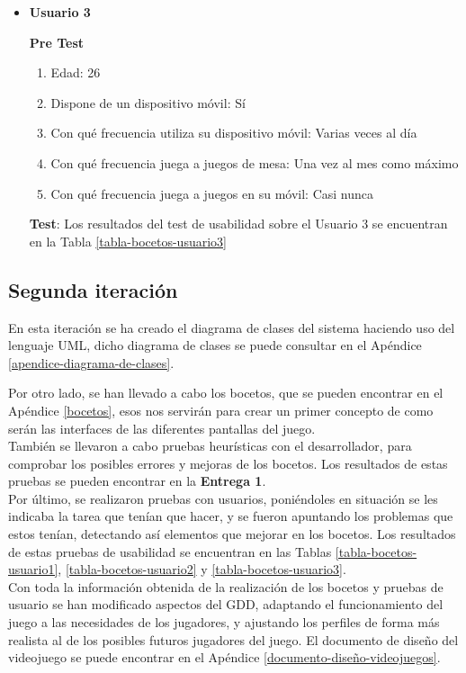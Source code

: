 \begin{itemize}
  \item \textbf{Usuario 3}

  \textbf{Pre Test}

  \begin{enumerate}
    \item Edad: 26
    \item Dispone de un dispositivo móvil: Sí
    \item Con qué frecuencia utiliza su dispositivo móvil: Varias veces al día
    \item Con qué frecuencia juega a juegos de mesa: Una vez al mes como máximo
    \item Con qué frecuencia juega a juegos en su móvil: Casi nunca
  \end{enumerate}

  \textbf{Test}: Los resultados del test de usabilidad sobre el Usuario 3 se encuentran en la Tabla \ref{tabla-bocetos-usuario3}

\end{itemize}

\subsection{Segunda iteración}
En esta iteración se ha creado el diagrama de clases del sistema haciendo uso del lenguaje UML, dicho diagrama de clases se puede consultar en el Apéndice \ref{apendice-diagrama-de-clases}.

Por otro lado, se han llevado a cabo los bocetos, que se pueden encontrar en el Apéndice \ref{bocetos}, esos nos servirán para crear un primer concepto de como serán las interfaces de las diferentes pantallas del juego.\\

También se llevaron a cabo pruebas heurísticas con el desarrollador, para comprobar los posibles errores y mejoras de los bocetos. Los resultados de estas pruebas se pueden encontrar en la \textbf{Entrega 1}.\\

Por último, se realizaron pruebas con usuarios, poniéndoles en situación se les indicaba la tarea que tenían que hacer, y se fueron apuntando los problemas que estos tenían, detectando así elementos que mejorar en los bocetos. Los resultados de estas pruebas de usabilidad se encuentran en las Tablas \ref{tabla-bocetos-usuario1}, \ref{tabla-bocetos-usuario2} y \ref{tabla-bocetos-usuario3}.\\

Con toda la información obtenida de la realización de los bocetos y pruebas de usuario se han modificado aspectos del GDD, adaptando el funcionamiento del juego a las necesidades de los jugadores, y ajustando los perfiles de forma más realista al de los posibles futuros jugadores del juego. El documento de diseño del videojuego se puede encontrar en el Apéndice \ref{documento-diseño-videojuegos}.

